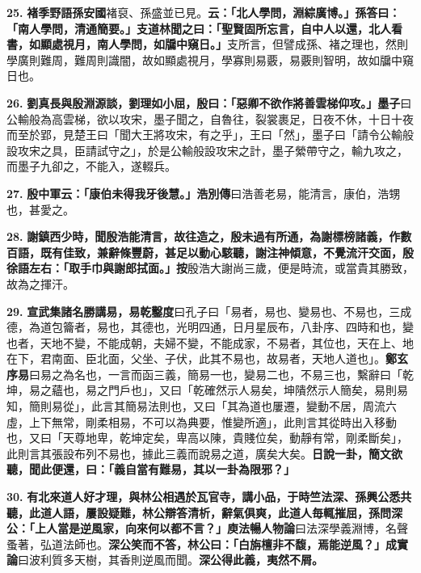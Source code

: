 \textbf{25.} \textbf{褚季野語孫安國}{\footnotesize 褚裒、孫盛並已見。}\textbf{云：「北人學問，淵綜廣博。」孫答曰：「南人學問，清通簡要。」支道林聞之曰：「聖賢固所忘言，自中人以還，北人看書，如顯處視月，南人學問，如牖中窺日。」}{\footnotesize 支所言，但譬成孫、褚之理也，然則學廣則難周，難周則識闇，故如顯處視月，學寡則易覈，易覈則智明，故如牖中窺日也。}

\textbf{26.} \textbf{劉真長與殷淵源談，劉理如小屈，殷曰：「惡卿不欲作將善雲梯仰攻。」}{\footnotesize \textbf{墨子}曰公輸般為高雲梯，欲以攻宋，墨子聞之，自魯往，裂裳裹足，日夜不休，十日十夜而至於郢，見楚王曰「聞大王將攻宋，有之乎」，王曰「然」，墨子曰「請令公輸般設攻宋之具，臣請試守之」，於是公輸般設攻宋之計，墨子縈帶守之，輸九攻之，而墨子九卻之，不能入，遂輟兵。}

\textbf{27.} \textbf{殷中軍云：「康伯未得我牙後慧。」}{\footnotesize \textbf{浩別傳}曰浩善老易，能清言，康伯，浩甥也，甚愛之。}

\textbf{28.} \textbf{謝鎮西少時，聞殷浩能清言，故往造之，殷未過有所通，為謝標榜諸義，作數百語，既有佳致，兼辭條豐蔚，甚足以動心駭聽，謝注神傾意，不覺流汗交面，殷徐語左右：「取手巾與謝郎拭面。」}{\footnotesize \textbf{按}殷浩大謝尚三歲，便是時流，或當貴其勝致，故為之揮汗。}

\textbf{29.} \textbf{宣武集諸名勝講易，}{\footnotesize \textbf{易乾鑿度}曰孔子曰「易者，易也、變易也、不易也，三成德，為道包籥者，易也，其德也，光明四通，日月星辰布，八卦序、四時和也，變也者，天地不變，不能成朝，夫婦不變，不能成家，不易者，其位也，天在上、地在下，君南面、臣北面，父坐、子伏，此其不易也，故易者，天地人道也」。\textbf{鄭玄序易}曰易之為名也，一言而函三義，簡易一也，變易二也，不易三也，繫辭曰「乾坤，易之蘊也，易之門戶也」，又曰「乾確然示人易矣，坤隤然示人簡矣，易則易知，簡則易從」，此言其簡易法則也，又曰「其為道也屢遷，變動不居，周流六虛，上下無常，剛柔相易，不可以為典要，惟變所適」，此則言其從時出入移動也，又曰「天尊地卑，乾坤定矣，卑高以陳，貴賤位矣，動靜有常，剛柔斷矣」，此則言其張設布列不易也，據此三義而說易之道，廣矣大矣。}\textbf{日說一卦，簡文欲聽，聞此便還，曰：「義自當有難易，其以一卦為限邪？」}

\textbf{30.} \textbf{有北來道人好才理，與林公相遇於瓦官寺，講小品，于時竺法深、孫興公悉共聽，此道人語，屢設疑難，林公辯答清析，辭氣俱爽，此道人毎輒摧屈，孫問深公：「上人當是逆風家，向來何以都不言？」}{\footnotesize \textbf{庾法暢人物論}曰法深學義淵博，名聲蚤著，弘道法師也。}\textbf{深公笑而不答，林公曰：「白旃檀非不馥，焉能逆風？」}{\footnotesize \textbf{成實論}曰波利質多天樹，其香則逆風而聞。}\textbf{深公得此義，夷然不屑。}

